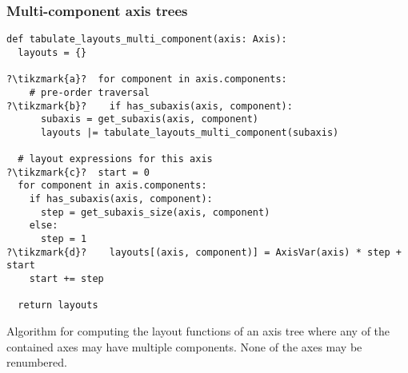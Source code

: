 \documentclass[thesis]{subfiles}
\begin{document}
\subsubsection{Multi-component axis trees}

\begin{algorithm}
  \begin{verbatim}
def tabulate_layouts_multi_component(axis: Axis):
  layouts = {}

?\tikzmark{a}?  for component in axis.components:
    # pre-order traversal
?\tikzmark{b}?    if has_subaxis(axis, component): 
      subaxis = get_subaxis(axis, component)
      layouts |= tabulate_layouts_multi_component(subaxis)

  # layout expressions for this axis
?\tikzmark{c}?  start = 0
  for component in axis.components:
    if has_subaxis(axis, component):
      step = get_subaxis_size(axis, component)
    else:
      step = 1
?\tikzmark{d}?    layouts[(axis, component)] = AxisVar(axis) * step + start
    start += step

  return layouts
  \end{verbatim}


  \caption{
    Algorithm for computing the layout functions of an axis tree where any of the contained axes may have multiple components.
    None of the axes may be renumbered.
  }
  \label{alg:tabulate_layouts_linear}
\end{algorithm}
\end{document}
